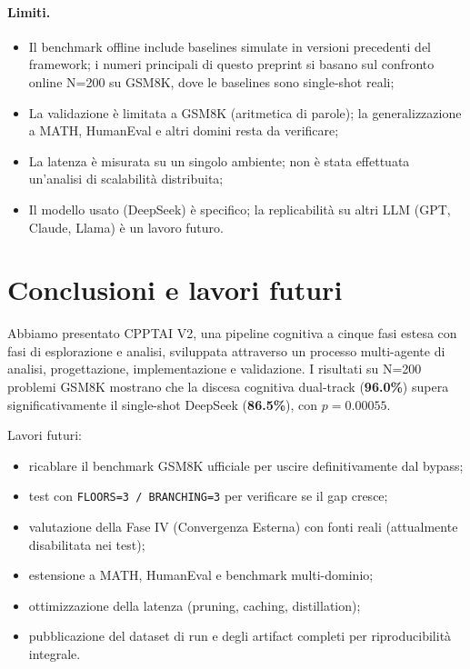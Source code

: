 \documentclass[11pt,a4paper]{article}
\begin{document}
\paragraph{Limiti.}
\begin{itemize}[leftmargin=1.2em]
  \item Il benchmark offline include baselines simulate in versioni precedenti
        del framework; i numeri principali di questo preprint si basano sul
        confronto online N=200 su GSM8K, dove le baselines sono single-shot reali;
  \item La validazione è limitata a GSM8K (aritmetica di parole); la
        generalizzazione a MATH, HumanEval e altri domini resta da verificare;
  \item La latenza è misurata su un singolo ambiente; non è stata effettuata
        un'analisi di scalabilità distribuita;
  \item Il modello usato (DeepSeek) è specifico; la replicabilità su altri LLM
        (GPT, Claude, Llama) è un lavoro futuro.
\end{itemize}

\section{Conclusioni e lavori futuri}
\label{sec:conclusioni}

Abbiamo presentato CPPTAI V2, una pipeline cognitiva a cinque fasi estesa con
fasi di esplorazione e analisi, sviluppata attraverso un processo multi-agente
di analisi, progettazione, implementazione e validazione. I risultati su N=200
problemi GSM8K mostrano che la discesa cognitiva dual-track (\textbf{96.0\%})
supera significativamente il single-shot DeepSeek (\textbf{86.5\%}), con
$p = 0.00055$.

Lavori futuri:
\begin{itemize}[leftmargin=1.2em]
  \item ricablare il benchmark GSM8K ufficiale per uscire definitivamente dal bypass;
  \item test con \texttt{FLOORS=3 / BRANCHING=3} per verificare se il gap cresce;
  \item valutazione della Fase IV (Convergenza Esterna) con fonti reali
        (attualmente disabilitata nei test);
  \item estensione a MATH, HumanEval e benchmark multi-dominio;
  \item ottimizzazione della latenza (pruning, caching, distillation);
  \item pubblicazione del dataset di run e degli artifact completi per
        riproducibilità integrale.
\end{itemize}
\end{document}
